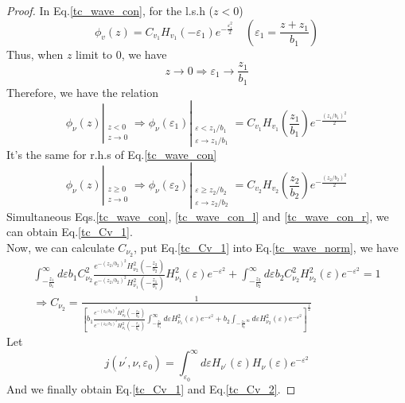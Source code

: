   \begin{proof}
    In Eq.\eqref{tc_wave_con}, for the l.s.h ($z < 0$)
    \begin{equation}
      \phi_v(z) = C_{v_1} H_{v_1}(-\varepsilon_1) e^{-\frac{\varepsilon_1^2}{2}}  \quad (\varepsilon_1 = \frac{z+z_1}{b_1})
    \end{equation}
    Thus, when $z$ limit to $0$, we have
    \begin{equation}
      z \to 0 \Rightarrow \varepsilon_1 \to \frac{z_1}{b_1}
    \end{equation}
    Therefore, we have the relation
    \begin{equation}
      \phi_\nu(z) \left|_{\substack{z < 0 \\ z \to 0}} \right. \Rightarrow \phi_\nu(\varepsilon_1) \left|_{\substack{\varepsilon < z_1/b_1 \\ \varepsilon \to z_1/b_1}} \right. = C_{v_1} H_{v_1}(\frac{z_1}{b_1}) e^{-\frac{(z_1/b_1)^2}{2}} \label{tc_wave_con_l}
    \end{equation}
    It's the same for r.h.s of Eq.\eqref{tc_wave_con}
    \begin{equation}
      \phi_\nu(z) \left|_{\substack{z \geqslant 0 \\ z \to 0}} \right. \Rightarrow \phi_\nu(\varepsilon_2) \left|_{\substack{\varepsilon \geqslant z_2/b_2 \\ \varepsilon \to z_2/b_2}} \right. = C_{v_2} H_{v_2}(\frac{z_2}{b_2}) e^{-\frac{(z_2/b_2)^2}{2}} \label{tc_wave_con_r}
    \end{equation}
    Simultaneous Eqs.\eqref{tc_wave_con}, \eqref{tc_wave_con_l} and \eqref{tc_wave_con_r}, we can obtain Eq.\eqref{tc_Cv_1}. \\
    Now, we can calculate $C_{\nu_2}$, put Eq.\eqref{tc_Cv_1} into Eq.\eqref{tc_wave_norm}, we have
    \begin{equation}
      \begin{aligned}
        \int_{-\frac{z_1}{b_1}}^{\infty} d\varepsilon b_1 C_{\nu_2}^2 \frac{e^{-(z_2/b_2)^2} H_{\nu_2}^2(-\frac{z_2}{b_2})}{e^{-(z_2/b_2)^2}H_{\nu_1}^2(-\frac{z_1}{b_1})} H_{\nu_1}^2(\varepsilon) e^{-\varepsilon^2}  + \int_{-\frac{z_2}{b_2}}^{\infty} d\varepsilon b_2 C_{\nu_2}^2 H_{\nu_2}^2(\varepsilon) e^{-\varepsilon^2} = 1  \\
        \Rightarrow C_{\nu_2} = \frac{1}{\left[ b_1 \frac{e^{-(z_2/b_2)^2} H_{\nu_2}^2(-\frac{z_2}{b_2})}{e^{-(z_2/b_2)^2}H_{\nu_1}^2(-\frac{z_1}{b_1})} \int_{-\frac{z_1}{b_1}}^{\infty} d\varepsilon H_{\nu_1}^2(\varepsilon) e^{-\varepsilon^2} + b_2 \int_{-\frac{z_2}{b_2}^{\infty}} d\varepsilon H_{\nu_2}^2(\varepsilon) e^{-\varepsilon^2} \right]^{\frac{1}{2}}}
      \end{aligned}
    \end{equation}
    Let
    \begin{equation*}
      j(\nu^\prime, \nu, \varepsilon_0) = \int_{\varepsilon_0}^{\infty} d\varepsilon H_{\nu^\prime}(\varepsilon) H_{\nu}(\varepsilon) e^{-\varepsilon^2}
    \end{equation*}
    And we finally obtain Eq.\eqref{tc_Cv_1} and Eq.\eqref{tc_Cv_2}.
  \end{proof}

